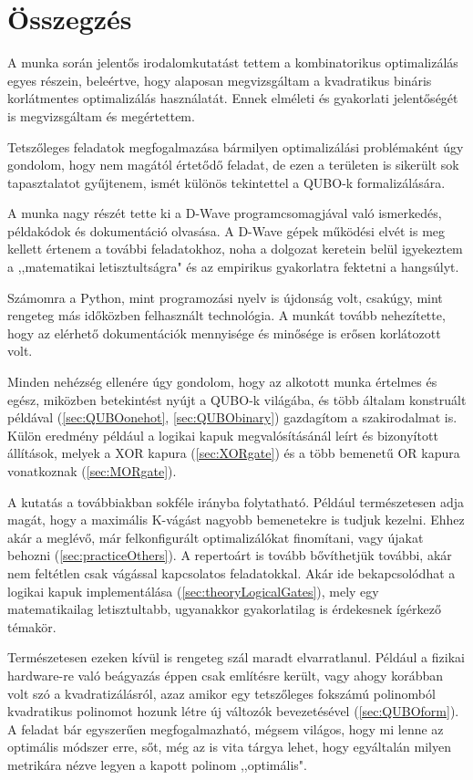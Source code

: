 
\chapter{Összegzés}

A munka során jelentős irodalomkutatást tettem a kombinatorikus optimalizálás egyes részein, beleértve, hogy alaposan megvizsgáltam a kvadratikus bináris korlátmentes optimalizálás használatát. Ennek elméleti és gyakorlati jelentőségét is megvizsgáltam és megértettem.

Tetszőleges feladatok megfogalmazása bármilyen optimalizálási problémaként úgy gondolom, hogy nem magától értetődő feladat, de ezen a területen is sikerült sok tapasztalatot gyűjtenem, ismét különös tekintettel a QUBO-k formalizálására.

A munka nagy részét tette ki a D-Wave programcsomagjával való ismerkedés, példakódok és dokumentáció olvasása. A D-Wave gépek működési elvét is meg kellett értenem a további feladatokhoz, noha a dolgozat keretein belül igyekeztem a ,,matematikai letisztultságra" és az empirikus gyakorlatra fektetni a hangsúlyt.

Számomra a Python, mint programozási nyelv is újdonság volt, csakúgy, mint rengeteg más időközben felhasznált technológia. A munkát tovább nehezítette, hogy az elérhető dokumentációk mennyisége és minősége is erősen korlátozott volt.

Minden nehézség ellenére úgy gondolom, hogy az alkotott munka értelmes és egész, miközben betekintést nyújt a QUBO-k világába, és több általam konstruált példával (\ref{sec:QUBOonehot}, \ref{sec:QUBObinary}) gazdagítom a szakirodalmat is. Külön eredmény például a logikai kapuk megvalósításánál leírt és bizonyított állítások, melyek a XOR kapura (\ref{sec:XORgate}) és a több bemenetű OR kapura vonatkoznak (\ref{sec:MORgate}).

A kutatás a továbbiakban sokféle irányba folytatható. Például természetesen adja magát, hogy a maximális K-vágást nagyobb bemenetekre is tudjuk kezelni. Ehhez akár a meglévő, már felkonfigurált optimalizálókat finomítani, vagy újakat behozni (\ref{sec:practiceOthers}). A repertoárt is tovább bővíthetjük további, akár nem feltétlen csak vágással kapcsolatos feladatokkal. Akár ide bekapcsolódhat a logikai kapuk implementálása (\ref{sec:theoryLogicalGates}), mely egy matematikailag letisztultabb, ugyanakkor gyakorlatilag is érdekesnek ígérkező témakör.

Természetesen ezeken kívül is rengeteg szál maradt elvarratlanul. Például a fizikai hardware-re való beágyazás éppen csak említésre került, vagy ahogy korábban volt szó a kvadratizálásról, azaz amikor egy tetszőleges fokszámú polinomból kvadratikus polinomot hozunk létre új változók bevezetésével (\ref{sec:QUBOform}). A feladat bár egyszerűen megfogalmazható, mégsem világos, hogy mi lenne az optimális módszer erre, sőt, még az is vita tárgya lehet, hogy egyáltalán milyen metrikára nézve legyen a kapott polinom ,,optimális".